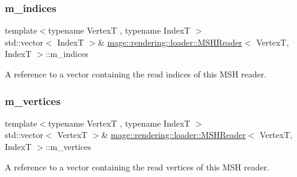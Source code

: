 \subsubsection{\texorpdfstring{m\+\_\+indices}{m\_indices}}
{\footnotesize\ttfamily template$<$typename VertexT , typename IndexT $>$ \\
std\+::vector$<$ IndexT $>$\& \hyperlink{classmage_1_1rendering_1_1loader_1_1_m_s_h_reader}{mage\+::rendering\+::loader\+::\+M\+S\+H\+Reader}$<$ VertexT, IndexT $>$\+::m\+\_\+indices\hspace{0.3cm}{\ttfamily [private]}}

A reference to a vector containing the read indices of this M\+SH reader. \hypertarget{classmage_1_1rendering_1_1loader_1_1_m_s_h_reader_a57e5f4e14aecbce999df14d0dcaba4e5}{}\label{classmage_1_1rendering_1_1loader_1_1_m_s_h_reader_a57e5f4e14aecbce999df14d0dcaba4e5} 
\subsubsection{\texorpdfstring{m\+\_\+vertices}{m\_vertices}}
{\footnotesize\ttfamily template$<$typename VertexT , typename IndexT $>$ \\
std\+::vector$<$ VertexT $>$\& \hyperlink{classmage_1_1rendering_1_1loader_1_1_m_s_h_reader}{mage\+::rendering\+::loader\+::\+M\+S\+H\+Reader}$<$ VertexT, IndexT $>$\+::m\+\_\+vertices\hspace{0.3cm}{\ttfamily [private]}}

A reference to a vector containing the read vertices of this M\+SH reader. 